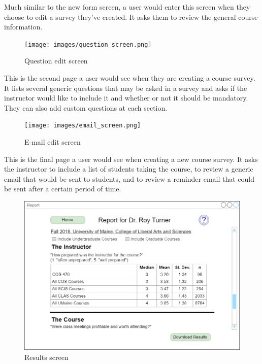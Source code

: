 \documentclass{article}
\begin{document}
Much similar to the new form screen, a user would enter this screen when they choose to edit a survey they've created. It asks them to review the general course information.

\begin{center}
\begin{figure}[H]
    \centering
    \caption{Question edit screen}
    \texttt{[image: images/question\_screen.png]}
\end{figure}
\end{center}

This is the second page a user would see when they are creating a course survey. It lists several generic questions that may be asked in a survey and asks if the instructor would like to include it and whether or not it should be mandatory. They can also add custom questions at each section.

\begin{center}
\begin{figure}[H]
    \centering
    \caption{E-mail edit screen}
    \texttt{[image: images/email\_screen.png]}
\end{figure}
\end{center}

This is the final page a user would see when creating a new course survey. It asks the instructor to include a list of students taking the course, to review a generic email that would be sent to students, and to review a reminder email that could be sent after a certain period of time.

\begin{center}
\begin{figure}[H]
    \centering
    \caption{Results screen}
    \includegraphics[scale=.35]{images/results_screen.png}
\end{figure}
\end{center}
\end{document}
